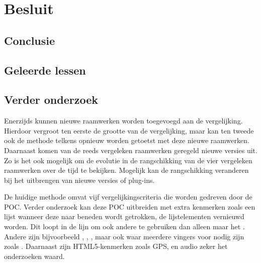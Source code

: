 \chapter{Besluit}
\label{chap:besluit}

\section{Conclusie} %


\section{Geleerde lessen} %


\pagebreak
\section{Verder onderzoek} %


Enerzijds kunnen nieuwe raamwerken worden toegevoegd aan de vergelijking.
Hierdoor vergroot ten eerste de grootte van de vergelijking, maar kan ten tweede ook de methode telkens opnieuw worden getoetst met deze nieuwe raamwerken.
Daarnaast komen van de reeds vergeleken raamwerken geregeld nieuwe versies uit.
Zo is het ook mogelijk om de evolutie in de rangschikking van de vier vergeleken raamwerken over de tijd te bekijken.
Mogelijk kan de rangschikking veranderen bij het uitbrengen van nieuwe versies of plug-ins.

De huidige methode omvat vijf vergelijkingscriteria die worden gedreven door de POC.
Verder onderzoek kan deze POC uitbreiden met extra kenmerken zoals een lijst wanneer deze naar beneden wordt getrokken, de lijstelementen vernieuwd worden.
Dit loopt in de lijn om ook andere  te gebruiken dan alleen maar het  .
Andere  zijn bijvoorbeeld , , , maar ook  waar meerdere vingers voor nodig zijn zoals .
Daarnaast zijn HTML5-kenmerken zoals GPS,  en audio zeker het onderzoeken waard.

